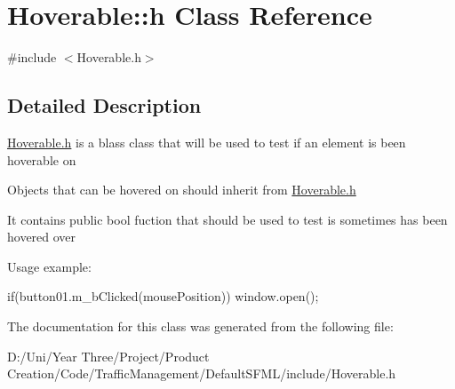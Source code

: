 \hypertarget{class_hoverable_1_1h}{}\section{Hoverable\+:\+:h Class Reference}
\label{class_hoverable_1_1h}


{\ttfamily \#include $<$Hoverable.\+h$>$}



\subsection{Detailed Description}
\hyperlink{class_hoverable_1_1h}{Hoverable.\+h} is a blass class that will be used to test if an element is been hoverable on

Objects that can be hovered on should inherit from \hyperlink{class_hoverable_1_1h}{Hoverable.\+h}

It contains public bool fuction that should be used to test is sometimes has been hovered over

Usage example\+: 
\begin{DoxyCode}
\textcolor{keywordflow}{if}(button01.m\_bClicked(mousePosition)) window.open();
\end{DoxyCode}
 

The documentation for this class was generated from the following file\+:\begin{DoxyCompactItemize}
\item 
D\+:/\+Uni/\+Year Three/\+Project/\+Product Creation/\+Code/\+Traffic\+Management/\+Default\+S\+F\+M\+L/include/Hoverable.\+h\end{DoxyCompactItemize}
